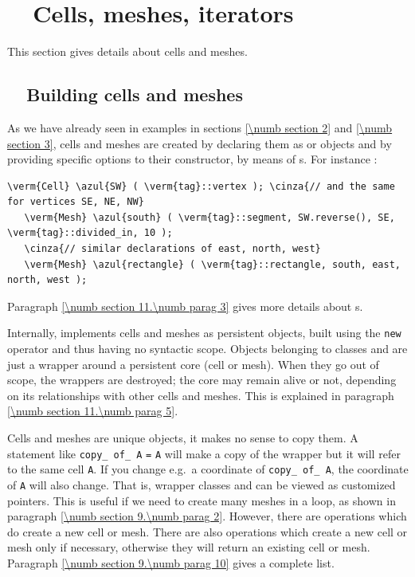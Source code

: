 
\chapter{~~Cells, meshes, iterators}\label{\numb section 9}


This section gives details about cells and meshes.

\section{~~Building cells and meshes}\label{\numb section 9.\numb parag 1}

As we have already seen in examples in sections \ref{\numb section 2} and \ref{\numb section 3},
cells and meshes are created by declaring them as {\small\tt {}} or
{\small\tt {}} objects
and by providing specific options to their constructor, by means of {\small\tt{}}s.
For instance :

\begin{Verbatim}[commandchars=\\\{\},formatcom=\small\tt,
   baselinestretch=0.94,framesep=2mm                      ]
   \verm{Cell} \azul{SW} ( \verm{tag}::vertex ); \cinza{// and the same for vertices SE, NE, NW}
   \verm{Mesh} \azul{south} ( \verm{tag}::segment, SW.reverse(), SE, \verm{tag}::divided_in, 10 );
   \cinza{// similar declarations of east, north, west}
   \verm{Mesh} \azul{rectangle} ( \verm{tag}::rectangle, south, east, north, west );
\end{Verbatim}

Paragraph \ref{\numb section 11.\numb parag 3} gives more details about {\small\tt{}}s.

Internally, {\maniFEM} implements cells and meshes as persistent objects, built
using the {\small\tt new} operator and thus having no syntactic scope.
Objects belonging to classes {\small\tt {}} and {\small\tt {}} are just a wrapper
around a persistent core (cell or mesh).
When they go out of scope, the wrappers are destroyed; the core may remain alive or not,
depending on its relationships with other cells and meshes.
This is explained in paragraph \ref{\numb section 11.\numb parag 5}.

Cells and meshes are unique objects, it makes no sense to copy them.
A statement like {\small\tt {}} {\small\tt copy\_\,of\_\,A} {\small\tt =} {\small\tt A}
will make a copy of the wrapper but it will refer to the same cell {\small\tt A}.
If you change e.g.\ a coordinate of {\small\tt copy\_\,of\_\,A}, the coordinate of {\small\tt A}
will also change.
That is, wrapper classes {\small\tt {}} and {\small\tt {}} can be viewed as
customized pointers.
This is useful if we need to create many meshes in a loop, as shown in paragraph
\ref{\numb section 9.\numb parag 2}.
However, there are operations which do create a new cell or mesh.
There are also operations which create a new cell or mesh only if necessary,
otherwise they will return an existing cell or mesh.
Paragraph \ref{\numb section 9.\numb parag 10} gives a complete list.

